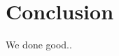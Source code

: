 \documentclass[MiniProjectMain]{subfiles}
\begin{document}
\chapter{Conclusion}
We done good..
\end{document}
